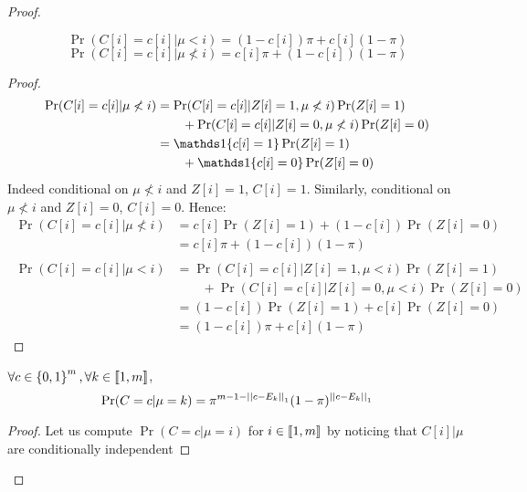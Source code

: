\begin{proof}
\begin{lemma}
    \[ \Pr(C[i] = c[i] | \mu < i) = (1 - c[i]) \pi + c[i] (1 - \pi) \]
    \[ \Pr(C[i] = c[i] | \mu \not< i) = c[i] \pi + (1 - c[i]) (1 - \pi) \]
\end{lemma}
\begin{proof}
    \begin{align}
        \Pr(C[i] = c[i] | \mu \not< i)
        &= \Pr(C[i] = c[i] | Z[i] = 1, \mu \not< i) \Pr(Z[i] = 1) \\
        &\qquad + \Pr(C[i] = c[i] | Z[i] = 0, \mu \not< i) \Pr(Z[i] = 0)\\
                &= \II\{c[i]=1\} \Pr(Z[i] = 1) \\
        &\qquad + \II\{c[i]=0\} \Pr(Z[i] = 0)
    \end{align}
    Indeed conditional on $\mu \not< i$ and $Z[i] = 1$, $C[i] = 1$. Similarly, conditional on $\mu \not< i$ and $Z[i] = 0$, $C[i] = 0$. Hence:
    \begin{align}
        \ \Pr(C[i] = c[i] | \mu \not< i)
        &= c[i] \Pr(Z[i] = 1) + (1 - c[i]) \Pr(Z[i] = 0)\\
        &= c[i] \pi + (1 - c[i]) (1 - \pi)\\
    \end{align}
    \begin{align}
        \ \Pr(C[i] = c[i] | \mu < i)
        &= \Pr(C[i] = c[i] | Z[i] = 1, \mu < i) \Pr(Z[i] = 1) \\
        & \qquad + \Pr(C[i] = c[i] | Z[i] = 0, \mu < i) \Pr(Z[i] = 0)\\
        &= (1 - c[i]) \Pr(Z[i] = 1) + c[i] \Pr(Z[i] = 0)\\
        &= (1 - c[i]) \pi + c[i] (1 - \pi)
    \end{align}
\end{proof}

\begin{lemma}
    \label{lemma:p_c_mu}
    $\forall c \in \left\{ 0, 1 \right\}^m, \forall k \in \left\llbracket1, m\right\rrbracket$,
    \[\Pr(C = c | \mu = k) = \pi^{m - 1 - \left|\left|c - E_k\right|\right|_1} (1 - \pi)^{\left|\left|c - E_k\right|\right|_1}\]
\end{lemma}
\begin{proof}
    Let us compute $\Pr(C = c| \mu = i)$ for $i \in \left\llbracket1, m\right\rrbracket$ by noticing that $C[i] | \mu$ are conditionally independent


\end{proof}
\end{proof}
